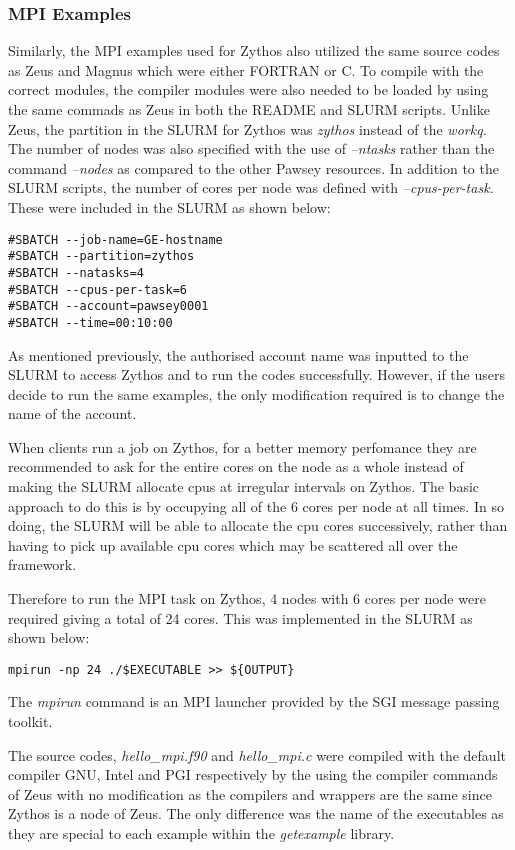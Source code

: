 \subsubsection{MPI Examples}

Similarly, the MPI examples used for Zythos also utilized the same source codes as Zeus and Magnus which were either FORTRAN or C. To compile with the
correct modules, the compiler modules were also needed to be loaded by using the same commads as Zeus in both the README and SLURM scripts. Unlike Zeus, 
the partition in the SLURM for Zythos was \emph{zythos} instead of the \emph{workq.} The number of nodes was also specified with the use of 
\emph{--ntasks} rather than the command \emph{--nodes} as compared to the other Pawsey resources. In addition to the SLURM scripts, the number of cores 
per node was defined with \emph{--cpus-per-task.} These were included in the SLURM as shown below:

\begin{tcolorbox}
\begin{Verbatim}[fontsize=\scriptsize]
#SBATCH --job-name=GE-hostname
#SBATCH --partition=zythos
#SBATCH --natasks=4
#SBATCH --cpus-per-task=6
#SBATCH --account=pawsey0001
#SBATCH --time=00:10:00
\end{Verbatim}
\end{tcolorbox}

As mentioned previously, the authorised account name was inputted to the SLURM to access Zythos and to run the codes successfully. However, if the
users decide to run the same examples, the only modification required is to change the name of the account.

When clients run a job on Zythos, for a better memory perfomance they are recommended to ask for the entire cores on the node as a whole instead of 
making the SLURM allocate cpus at irregular intervals on Zythos. The basic approach to do this is by occupying all of the 6 cores per node at all times.
In so doing, the SLURM will be able to allocate the cpu cores successively, rather than having to pick up available cpu cores which may be scattered all 
over the framework. 

Therefore to run the MPI task on Zythos, 4 nodes with 6 cores per node were required giving a total of 24 cores. This was implemented 
in the SLURM as shown below:

\begin{tcolorbox}
\begin{Verbatim}[fontsize=\scriptsize]
mpirun -np 24 ./$EXECUTABLE >> ${OUTPUT}
\end{Verbatim}
\end{tcolorbox}

The \emph{mpirun} command is an MPI launcher provided by the SGI message passing toolkit.

The source codes, \emph{hello\_mpi.f90} and \emph{hello\_mpi.c} were compiled with the default compiler GNU, Intel and PGI respectively by the using the 
compiler commands of Zeus with no modification as the compilers and wrappers are the same since Zythos is a node of Zeus. The only difference was the 
name of the executables as they are special to each example within the \emph{getexample} library.
